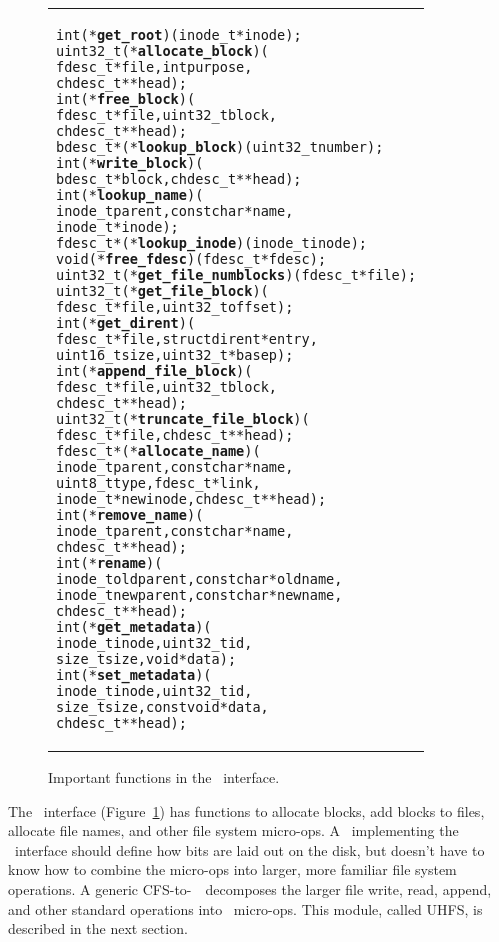 \begin{figure}[thb]
\vskip-14pt
\begin{tabular}{@{\hskip0.25in}p{2in}@{}}
\begin{scriptsize}
\begin{alltt}
int (*\textbf{get_root})(inode_t *inode);
uint32_t (*\textbf{allocate_block})(
    fdesc_t *file, int purpose,
    chdesc_t **head);
int (*\textbf{free_block})(
    fdesc_t *file, uint32_t block,
    chdesc_t **head);
bdesc_t *(*\textbf{lookup_block})(uint32_t number);
int (*\textbf{write_block})(
    bdesc_t *block, chdesc_t **head);
int (*\textbf{lookup_name})(
    inode_t parent, const char *name,
    inode_t *inode);
fdesc_t *(*\textbf{lookup_inode})(inode_t inode);
void (*\textbf{free_fdesc})(fdesc_t *fdesc);
uint32_t (*\textbf{get_file_numblocks})(fdesc_t *file);
uint32_t (*\textbf{get_file_block})(
    fdesc_t *file, uint32_t offset);
int (*\textbf{get_dirent})(
    fdesc_t *file, struct dirent *entry,
    uint16_t size, uint32_t *basep);
int (*\textbf{append_file_block})(
    fdesc_t *file, uint32_t block,
    chdesc_t **head);
uint32_t (*\textbf{truncate_file_block})(
    fdesc_t *file, chdesc_t **head);
fdesc_t *(*\textbf{allocate_name})(
    inode_t parent, const char *name,
    uint8_t type, fdesc_t *link,
    inode_t *newinode, chdesc_t **head);
int (*\textbf{remove_name})(
    inode_t parent, const char *name,
    chdesc_t **head);
int (*\textbf{rename})(
    inode_t oldparent, const char *oldname,
    inode_t newparent, const char *newname,
    chdesc_t **head);
int (*\textbf{get_metadata})(
    inode_t inode, uint32_t id,
    size_t size, void *data);
int (*\textbf{set_metadata})(
    inode_t inode, uint32_t id,
    size_t size, const void *data,
    chdesc_t **head);
\end{alltt}
\end{scriptsize}
\end{tabular}
\vspace{-10pt}
\caption{\label{fig:lfs} Important functions in the \LFS\ interface.}
\end{figure}

The \LFS\ interface (Figure~\ref{fig:lfs}) has functions to allocate blocks, add
blocks to files, allocate file names, and other file system micro-ops. A
\module\ implementing the \LFS\ interface should define how bits are laid out on
the disk, but doesn't have to know how to combine the micro-ops into larger,
more familiar file system operations. A generic CFS-to-\LFS\ \module\ decomposes
the larger file write, read, append, and other standard operations into \LFS\
micro-ops. This module, called UHFS, is described in the next section.

